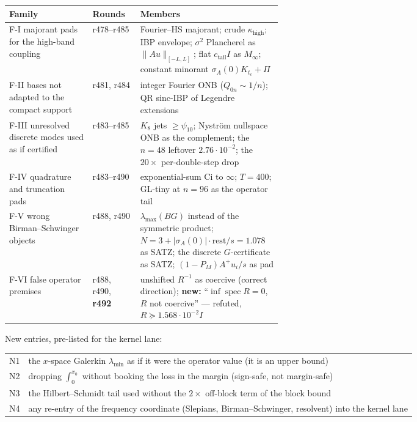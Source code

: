 \documentclass[11pt]{article}
\theoremstyle{remark}
\begin{document}
\begin{center}
\small
\begin{tabular}{@{}llp{0.52\linewidth}@{}}
\toprule
Family & Rounds & Members \\
\midrule
F-I majorant pads for the high-band coupling
  & r478--r485
  & Fourier--HS majorant; crude $\kappa_{\mathrm{high}}$;
    IBP envelope; $\sigma^2$ Plancherel as
    $\|Au\|_{[-L,L]}$; flat $c_{\mathrm{tail}}I$ as $M_\infty$;
    constant minorant $\sigma_A(0)K_{t_c}+\Pi$ \\
F-II bases not adapted to the compact support
  & r481, r484
  & integer Fourier ONB ($Q_{0n}\sim1/n$);
    QR sinc-IBP of Legendre extensions \\
F-III unresolved discrete modes used as if certified
  & r483--r485
  & $K_8$ jets $\ge\psi_{10}$; Nystr\"om nullspace ONB as the
    complement; the $n=48$ leftover $2.76\cdot10^{-2}$;
    the $20\times$ per-double-step drop \\
F-IV quadrature and truncation pads
  & r483--r490
  & exponential-sum Ci to $\infty$; $T=400$;
    GL-tiny at $n=96$ as the operator tail \\
F-V wrong Birman--Schwinger objects
  & r488, r490
  & $\lambda_{\max}(BG)$ instead of the symmetric product;
    $N=3+|\sigma_A(0)|\cdot\mathrm{rest}/s=1.078$ as SATZ;
    the discrete $G$-certificate as SATZ;
    $(1-P_M)A^+u_i/s$ as pad \\
F-VI false operator premises
  & r488, r490, \textbf{r492}
  & unshifted $R^{-1}$ as coercive (correct direction);
    \textbf{new:} ``$\inf\operatorname{spec}R=0$, $R$ not
    coercive'' --- refuted,
    $R\succeq1.568\cdot10^{-2}I$ \\
\bottomrule
\end{tabular}
\end{center}

\noindent New entries, pre-listed for the kernel lane:

\begin{center}
\small
\begin{tabular}{@{}ll@{}}
\toprule
N1 & the $x$-space Galerkin $\lambda_{\min}$ as if it were the
     operator value (it is an upper bound) \\
N2 & dropping $\int_0^{x_0}$ without booking the loss in the
     margin (sign-safe, not margin-safe) \\
N3 & the Hilbert--Schmidt tail used without the $2\times$
     off-block term of the block bound \\
N4 & any re-entry of the frequency coordinate (Slepians,
     Birman--Schwinger, resolvent) into the kernel lane \\
\bottomrule
\end{tabular}
\end{center}
\end{document}
